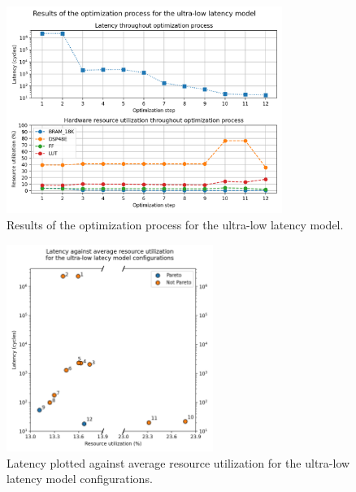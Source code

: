 \indo{|}
\indo{|}
\indo{|}

\begin{figure}[hpt!]
  \centering
  \includegraphics[trim={0cm 0cm 0cm 1cm}, clip, width=0.8\textwidth, center]{../logs/hardware_optimizations.png}
  \caption{Results of the optimization process for the ultra-low latency model.}
  \label{fig:hardware-optimizations}
\end{figure}

\indo{|}
\indo{|}
\indo{|}

\begin{figure}[hpt!]
  \centering
  \includegraphics[trim={0cm 0cm 0cm 1.3cm}, clip, width=0.6\textwidth, center]{../logs/hardware_optimizations_pareto.png}
  \caption{Latency plotted against average resource utilization for the ultra-low latency model configurations.}
  \label{fig:hardware-optimizations-pareto}
\end{figure}


